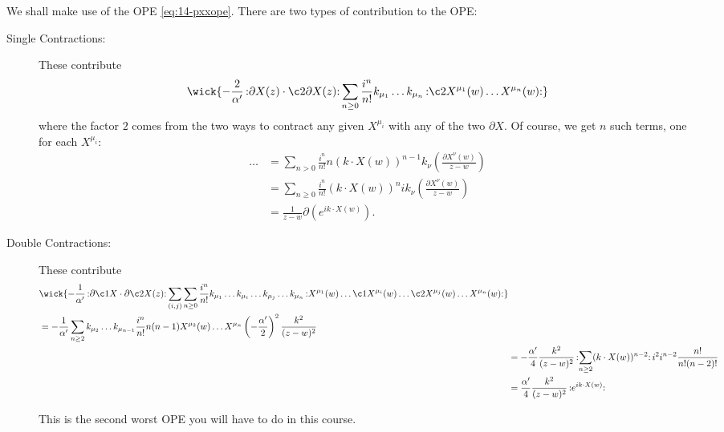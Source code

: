 We shall make use of the OPE \eqref{eq:14-pxxope}. There are two types of contribution to the OPE:
\begin{description}
  \item[Single Contractions:] These contribute
    \begin{equation}
      \wick{-\frac{2}{\alpha'} \normalorder{\partial X (z) \cdot \c2{\partial X(z)}} \sum_{n \geq 0} \frac{i^n}{n!} k_{\mu_1} \dots k_{\mu_n} \normalorder{\c2 X^{\mu_1} (w) \dots X^{\mu_n}(w)}}
    \end{equation}
    where the factor $2$ comes from the two ways to contract any given $X^{\mu_i}$ with any of the two $\partial X$.
    Of course, we get $n$ such terms, one for each $X^{\mu_i}$:
    \begin{align}
      \dots &= \sum_{n > 0} \frac{i^n}{n!} n (k \cdot X(w))^{n-1} k_{\nu} \left( \frac{\partial X^{\nu} (w)}{ z - w} \right) \\
	    &= \sum_{n \geq 0} \frac{i^n}{n!} (k \cdot X(w))^n i k_{\nu} \left( \frac{\partial X^{\nu}(w)}{z - w} \right) \\
	    &= \frac{1}{z - w} \partial \left( e^{i k \cdot X(w)} \right).
    \end{align}
  \item[Double Contractions:] These contribute
    \begin{align}
      \begin{split}
	&\wick{ -\frac{1}{\alpha'} \normalorder{\partial \c1 X \cdot \partial \c2 X(z)} \sum_{(i, j)} \sum_{n \geq 0} \frac{i^n}{n!} k_{\mu_1} \dots k_{\mu_i} \dots k_{\mu_j} \dots k_{\mu_n} \normalorder{X^{\mu_1} (w) \dots \c1 X^{\mu_i}(w) \dots \c2 X^{\mu_j}(w) \dots X^{\mu_n}(w)} } \\
	&= -\frac{1}{\alpha'} \sum_{n \geq 2} k_{\mu_2} \dots k_{\mu_{n-1}} \frac{i^n}{n!} n (n-1) X^{\mu_2}(w) \dots X^{\mu_n} \left( -\frac{\alpha'}{2} \right)^2 \frac{k^2}{(z - w)^2}
      \end{split} \\
      &= -\frac{\alpha'}{4} \frac{k^2}{(z - w)^2} \normalorder{\sum_{n \geq 2} (k \cdot X(w))^{n-2}} i^2 i^{n-2} \frac{n!}{n! (n-2)!} \\
      &= \frac{\alpha'}{4} \frac{k^2}{(z - w)^2} \normalorder{e^{i k \cdot X(w)}}
    \end{align}
    \begin{leftbar}
      This is the second worst OPE you will have to do in this course.
    \end{leftbar}
\end{description}

